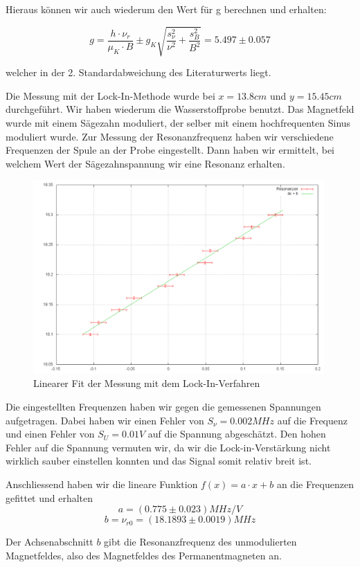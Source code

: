 Hieraus können wir auch wiederum den Wert für g berechnen und erhalten:

$$ g = \frac{h\cdot\nu_r}{\mu_K\cdot B} \pm g_K\sqrt{\frac{s_\nu^2}{\nu^2} + \frac{s_B^2}{B^2}} = 5.497 \pm 0.057 $$ 

welcher in der 2. Standardabweichung des Literaturwerts liegt.


Die Messung mit der Lock-In-Methode wurde bei $x=13.8cm$ und $y=15.45cm$ durchgeführt. Wir haben wiederum die Wasserstoffprobe benutzt. Das Magnetfeld wurde mit einem Sägezahn moduliert, der selber mit einem hochfrequenten Sinus moduliert wurde. Zur Messung der Resonanzfrequenz haben wir verschiedene Frequenzen der Spule an der Probe eingestellt. Dann haben wir ermittelt, bei welchem Wert der Sägezahnspannung wir eine Resonanz erhalten.

\begin{figure}[H]
\centering \includegraphics[width=0.99\textwidth]{Bilder/lockin.png}
\caption{Linearer Fit der Messung mit dem Lock-In-Verfahren}
\end{figure}

Die eingestellten Frequenzen haben wir gegen die gemessenen Spannungen aufgetragen. Dabei haben wir einen Fehler von $S_\nu = 0.002 MHz$ auf die Frequenz und einen Fehler von $S_U = 0.01 V$ auf die Spannung abgeschätzt. Den hohen Fehler auf die Spannung vermuten wir, da wir die Lock-in-Verstärkung nicht wirklich sauber einstellen konnten und das Signal somit relativ breit ist.

Anschliessend haben wir die lineare Funktion $f\left( x \right) = a \cdot x + b$ an die Frequenzen gefittet und erhalten
$$ a =   (0.775 \pm 0.023) MHz/V $$
$$ \boxed{b = \nu_{r0} = (18.1893 \pm 0.0019) MHz} $$

Der Achsenabschnitt $b$ gibt die Resonanzfrequenz des unmodulierten Magnetfeldes, also des Magnetfeldes des Permanentmagneten an.







